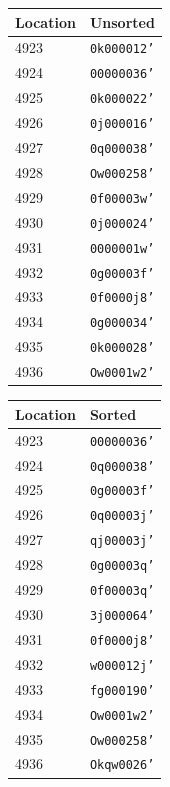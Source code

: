 \begin{table}[h!]
\centering
\begin{minipage}{0.48\textwidth}
\centering
\begin{tabular}{ll}
\toprule
\textbf{Location} & \textbf{Unsorted} \\
\midrule
4923 & \texttt{0k000012'} \\
4924 & \texttt{00000036'} \\
4925 & \texttt{0k000022'} \\
4926 & \texttt{0j000016'} \\
4927 & \texttt{0q000038'} \\
4928 & \texttt{Ow000258'} \\
4929 & \texttt{0f00003w'} \\
4930 & \texttt{0j000024'} \\
4931 & \texttt{0000001w'} \\
4932 & \texttt{0g00003f'} \\
4933 & \texttt{0f0000j8'} \\
4934 & \texttt{0g000034'} \\
4935 & \texttt{0k000028'} \\
4936 & \texttt{Ow0001w2'} \\
\bottomrule
\end{tabular}
\end{minipage}
\hfill
\begin{minipage}{0.48\textwidth}
\centering
\begin{tabular}{ll}
\toprule
\textbf{Location} & \textbf{Sorted} \\
\midrule
4923 & \texttt{00000036'} \\
4924 & \texttt{0q000038'} \\
4925 & \texttt{0g00003f'} \\
4926 & \texttt{0q00003j'} \\
4927 & \texttt{qj00003j'} \\
4928 & \texttt{0g00003q'} \\
4929 & \texttt{0f00003q'} \\
4930 & \texttt{3j000064'} \\
4931 & \texttt{0f0000j8'} \\
4932 & \texttt{w000012j'} \\
4933 & \texttt{fg000190'} \\
4934 & \texttt{Ow0001w2'} \\
4935 & \texttt{Ow000258'} \\
4936 & \texttt{Okqw0026'} \\
\bottomrule
\end{tabular}
\end{minipage}
\end{table}

